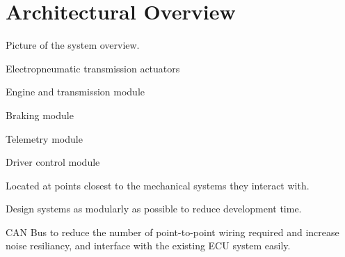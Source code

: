 \section{Architectural Overview}

Picture of the system overview.

Electropneumatic transmission actuators

Engine and transmission module

Braking module

Telemetry module

Driver control module

Located at points closest to the mechanical systems they interact
with.

Design systems as modularly as possible to reduce development time.

CAN Bus to reduce the number of point-to-point wiring required and
increase noise resiliancy, and interface with the existing ECU system
easily.
